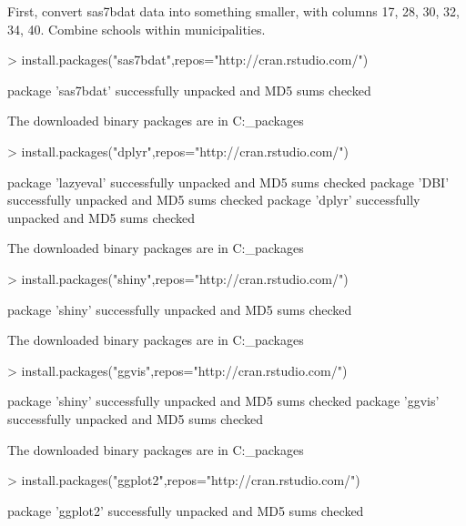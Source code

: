 \documentclass{article}
\begin{document}


First, convert sas7bdat data into something smaller, with columns 17, 28, 30, 32, 34, 40. Combine schools within municipalities.

\begin{Schunk}
\begin{Sinput}
> install.packages("sas7bdat",repos="http://cran.rstudio.com/")
\end{Sinput}
\begin{Soutput}
package 'sas7bdat' successfully unpacked and MD5 sums checked

The downloaded binary packages are in
	C:\Users\ramaka\AppData\Local\Temp{}\downloaded_packages
\end{Soutput}
\begin{Sinput}
> install.packages("dplyr",repos="http://cran.rstudio.com/")
\end{Sinput}
\begin{Soutput}
package 'lazyeval' successfully unpacked and MD5 sums checked
package 'DBI' successfully unpacked and MD5 sums checked
package 'dplyr' successfully unpacked and MD5 sums checked

The downloaded binary packages are in
	C:\Users\ramaka\AppData\Local\Temp{}\downloaded_packages
\end{Soutput}
\begin{Sinput}
> install.packages("shiny",repos="http://cran.rstudio.com/")
\end{Sinput}
\begin{Soutput}
package 'shiny' successfully unpacked and MD5 sums checked

The downloaded binary packages are in
	C:\Users\ramaka\AppData\Local\Temp{}\downloaded_packages
\end{Soutput}
\begin{Sinput}
> install.packages("ggvis",repos="http://cran.rstudio.com/")
\end{Sinput}
\begin{Soutput}
package 'shiny' successfully unpacked and MD5 sums checked
package 'ggvis' successfully unpacked and MD5 sums checked

The downloaded binary packages are in
	C:\Users\ramaka\AppData\Local\Temp{}\downloaded_packages
\end{Soutput}
\begin{Sinput}
> install.packages("ggplot2",repos="http://cran.rstudio.com/")
\end{Sinput}
\begin{Soutput}
package 'ggplot2' successfully unpacked and MD5 sums checked


\end{Soutput}
\end{Schunk}
\end{document}
